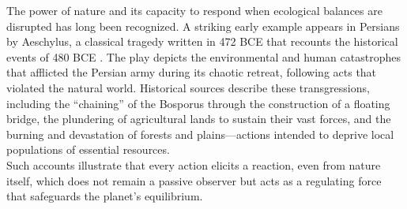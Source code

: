 \documentclass[12pt]{Definitions/academia}
\begin{document}
The power of nature and its capacity to respond when ecological balances
are disrupted has long been recognized. A striking early example appears
in  Persians by Aeschylus, a classical tragedy written in 472 BCE
that recounts the historical events of 480 BCE \textit{\cite{Aeschylus,Aeschylus-1}}.
The play depicts the environmental and human catastrophes that afflicted
the Persian army during its chaotic retreat, following acts that violated
the natural world. Historical sources describe these transgressions,
including the \textquotedblleft chaining\textquotedblright{} of the
Bosporus through the construction of a floating bridge, the plundering
of agricultural lands to sustain their vast forces, and the burning
and devastation of forests and plains---actions intended to deprive
local populations of essential resources.\\
 Such accounts illustrate
that every action elicits a reaction, even from nature itself, which
does not remain a passive observer but acts as a regulating force
that safeguards the planet\textquoteright s equilibrium.
\end{document}
